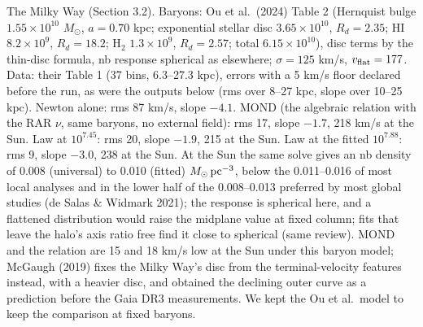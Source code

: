 \documentclass[
  10pt,
]{article}
\begin{document}
The Milky Way (Section 3.2). Baryons: Ou et al.~(2024) Table 2 (Hernquist bulge $1.55\times10^{10}$ $M_\odot$, $a=0.70$ kpc; exponential stellar disc $3.65\times10^{10}$, $R_d=2.35$; HI $8.2\times10^{9}$, $R_d=18.2$; H$_2$ $1.3\times10^{9}$, $R_d=2.57$; total $6.15\times10^{10}$), disc terms by the thin-disc formula, nb response spherical as elsewhere; $\sigma=125$ km/s, $v_{\rm flat}=177$. Data: their Table 1 (37 bins, 6.3--27.3 kpc), errors with a 5 km/s floor declared before the run, as were the outputs below (rms over 8--27 kpc, slope over 10--25 kpc). Newton alone: rms 87 km/s, slope $-4.1$. MOND (the algebraic relation with the RAR $\nu$, same baryons, no external field): rms 17, slope $-1.7$, 218 km/s at the Sun. Law at $10^{7.45}$: rms 20, slope $-1.9$, 215 at the Sun. Law at the fitted $10^{7.88}$: rms 9, slope $-3.0$, 238 at the Sun. At the Sun the same solve gives an nb density of 0.008 (universal) to 0.010 (fitted) $M_\odot\,{\rm pc}^{-3}$, below the 0.011--0.016 of most local analyses and in the lower half of the 0.008--0.013 preferred by most global studies (de Salas \& Widmark 2021); the response is spherical here, and a flattened distribution would raise the midplane value at fixed column; fits that leave the halo's axis ratio free find it close to spherical (same review). MOND and the relation are 15 and 18 km/s low at the Sun under this baryon model; McGaugh (2019) fixes the Milky Way's disc from the terminal-velocity features instead, with a heavier disc, and obtained the declining outer curve as a prediction before the Gaia DR3 measurements. We kept the Ou et al.\ model to keep the comparison at fixed baryons.
\end{document}
